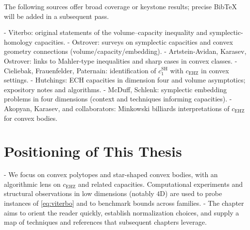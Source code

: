 The following sources offer broad coverage or keystone results; precise BibTeX will be added in a
subsequent pass.

- Viterbo: original statements of the volume--capacity inequality and symplectic-homology capacities.
- Ostrover: surveys on symplectic capacities and convex geometry connections (volume/capacity/embedding).
- Artstein-Avidan, Karasev, Ostrover: links to Mahler-type inequalities and sharp cases in convex classes.
- Cieliebak, Frauenfelder, Paternain: identification of $c_1^{\mathrm{SH}}$ with $c_{\mathrm{EHZ}}$ in convex settings.
- Hutchings: ECH capacities in dimension four and volume asymptotics; expository notes and algorithms.
- McDuff, Schlenk: symplectic embedding problems in four dimensions (context and techniques informing capacities).
- Akopyan, Karasev, and collaborators: Minkowski billiards interpretations of $c_{\mathrm{EHZ}}$ for convex bodies.

\section{Positioning of This Thesis}

- We focus on convex polytopes and star-shaped convex bodies, with an algorithmic lens on
  $c_{\mathrm{EHZ}}$ and related capacities. Computational experiments and structural observations
  in low dimensions (notably $4$D) are used to probe instances of \eqref{eq:viterbo} and to
  benchmark bounds across families.
- The chapter aims to orient the reader quickly, establish normalization choices, and supply
  a map of techniques and references that subsequent chapters leverage.
